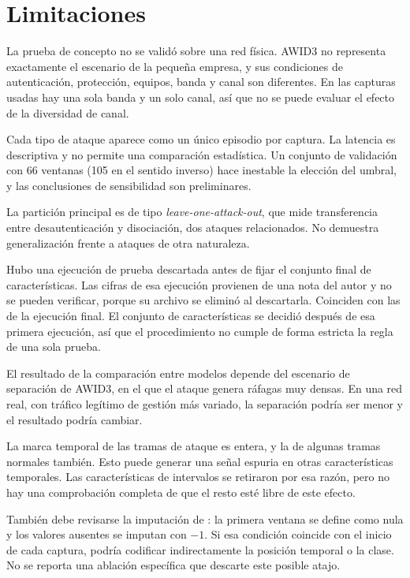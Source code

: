 \documentclass[journal]{IEEEtran}
\begin{document}
\section{Limitaciones}

La prueba de concepto no se validó sobre una red física. AWID3 no representa exactamente el escenario de la pequeña empresa, y sus condiciones de autenticación, protección, equipos, banda y canal son diferentes. En las capturas usadas hay una sola banda y un solo canal, así que no se puede evaluar el efecto de la diversidad de canal.

Cada tipo de ataque aparece como un único episodio por captura. La latencia es descriptiva y no permite una comparación estadística. Un conjunto de validación con 66 ventanas (105 en el sentido inverso) hace inestable la elección del umbral, y las conclusiones de sensibilidad son preliminares.

La partición principal es de tipo \textit{leave-one-attack-out}, que mide transferencia entre desautenticación y disociación, dos ataques relacionados. No demuestra generalización frente a ataques de otra naturaleza.

Hubo una ejecución de prueba descartada antes de fijar el conjunto final de características. Las cifras de esa ejecución provienen de una nota del autor y no se pueden verificar, porque su archivo se eliminó al descartarla. Coinciden con las de la ejecución final. El conjunto de características se decidió después de esa primera ejecución, así que el procedimiento no cumple de forma estricta la regla de una sola prueba.

El resultado de la comparación entre modelos depende del escenario de separación de AWID3, en el que el ataque genera ráfagas muy densas. En una red real, con tráfico legítimo de gestión más variado, la separación podría ser menor y el resultado podría cambiar.

La marca temporal de las tramas de ataque es entera, y la de algunas tramas normales también. Esto puede generar una señal espuria en otras características temporales. Las características de intervalos se retiraron por esa razón, pero no hay una comprobación completa de que el resto esté libre de este efecto.

También debe revisarse la imputación de : la primera ventana se define como nula y los valores ausentes se imputan con $-1$. Si esa condición coincide con el inicio de cada captura, podría codificar indirectamente la posición temporal o la clase. No se reporta una ablación específica que descarte este posible atajo.
\end{document}
